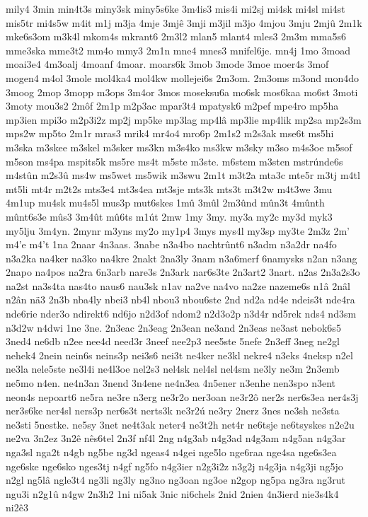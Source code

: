 {mily4
3min
min4t3s
miny3sk
miny5s6ke
3m4is3
mis4i
mi2sj
mi4sk
mi4sl
mi4st
mis5tr
mi4s5w
m4it
m1j
m3ja
4mje
3mjê
3mji
m3jil
m3jo
4mjou
3mju
2mjû
2m1k
mke6s3om
m3k4l
mkom4s
mkrant6
2m3l2
mlan5
mlant4
mles3
2m3m
mma5s6
mme3ska
mme3t2
mm4o
mmy3
2m1n
mne4
mnes3
mnifel6je.
mn4j
1mo
3moad
moai3e4
4m3oalj
4moanf
4moar.
moars6k
3mob
3mode
3moe
moer4s
3mof
mogen4
m4ol
3mole
mol4ka4
mol4kw
mollejei6s
2m3om.
2m3oms
m3ond
mon4do
3moog
2mop
3mopp
m3ops
3m4or
3mos
moseksu6a
mo6sk
mos6kaa
mo6st
3moti
3moty
mou3s2
2môf
2m1p
m2p3ac
mpar3t4
mpatysk6
m2pef
mpe4ro
mp5ha
mp3ien
mpi3o
m2p3i2z
mp2j
mp5ke
mp3lag
mp4lâ
mp3lie
mp4lik
mp2sa
mp2s3m
mps2w
mp5to
2m1r
mras3
mrik4
mr4o4
mro6p
2m1s2
m2s3ak
mse6t
ms5hi
m3ska
m3skee
m3skel
m3sker
ms3kn
m3s4ko
ms3kw
m3sky
m3so
m4s3oe
m5sof
m5son
ms4pa
mspits5k
ms5re
ms4t
m5ste
m3ste.
m6stem
m3sten
mstrúnde6s
m4stûn
m2s3û
ms4w
ms5wet
ms5wik
m3swu
2m1t
m3t2a
mta3c
mte5r
m3tj
m4tl
mt5li
mt4r
m2t2s
mts3e4
mt3s4ea
mt3sje
mts3k
mts3t
m3t2w
m4t3we
3mu
4m1up
mu4sk
mu4s5l
mus3p
mut6skes
1mû
3mûl
2m3ûnd
mûn3t
4mûnth
mûnt6s3e
mûs3
3m4ût
mû6ts
m1út
2mw
1my
3my.
my3a
my2c
my3d
myk3
my5lju
3m4yn.
2mynr
m3yns
my2o
my1p4
3mys
mys4l
my3sp
my3te
2m3z
2m'
m4'e
m4't
1na
2naar
4n3aas.
3nabe
n3a4bo
nachtrûnt6
n3adm
n3a2dr
na4fo
n3a2ka
na4ker
na3ko
na4kre
2nakt
2na3ly
3nam
n3a6merf
6namysks
n2an
n3ang
2napo
na4pos
na2ra
6n3arb
nare3s
2n3ark
nar6s3te
2n3art2
3nart.
n2as
2n3a2s3o
na2st
na3s4ta
nas4to
naus6
nau3sk
n1av
na2ve
na4vo
na2ze
nazeme6s
n1â
2nâl
n2ân
nä3
2n3b
nba4ly
nbei3
nb4l
nbou3
nbou6ste
2nd
nd2a
nd4e
ndeis3t
nde4ra
nde6rie
nder3o
ndirekt6
nd6jo
n2d3of
ndom2
n2d3o2p
n3d4r
nd5rek
nds4
nd3sm
n3d2w
n4dwi
1ne
3ne.
2n3eac
2n3eag
2n3ean
ne3and
2n3eas
ne3ast
nebok6s5
3ned4
ne6db
n2ee
nee4d
need3r
3neef
nee2p3
nee5ste
5nefe
2n3eff
3neg
ne2gl
nehek4
2nein
nein6s
neins3p
nei3s6
nei3t
ne4ker
ne3kl
nekre4
n3eks
4neksp
n2el
ne3la
nele5ste
ne3l4i
ne4l3oe
nel2s3
nel4sk
nel4sl
nel4sm
ne3ly
ne3m
2n3emb
ne5mo
n4en.
ne4n3an
3nend
3n4ene
ne4n3ea
4n5ener
n3enhe
nen3spo
n3ent
neon4s
nepoart6
ne5ra
ne3re
n3erg
ne3r2o
ner3oan
ne3r2ô
ner2s
ner6s3ea
ner4s3j
ner3s6ke
ner4sl
ners3p
ner6s3t
nerts3k
ne3r2ú
ne3ry
2nerz
3nes
ne3sh
ne3sta
ne3sti
5nestke.
ne5sy
3net
ne4t3ak
neter4
ne3t2h
net4r
ne6tsje
ne6tsyskes
n2e2u
ne2va
3n2ez
3n2ê
nês6tel
2n3f
nf4l
2ng
n4g3ab
n4g3ad
n4g3am
n4g5an
n4g3ar
nga3sl
nga2t
n4gb
ng5be
ng3d
ngeas4
n4gei
nge5lo
nge6raa
nge4sa
nge6s3ea
nge6ske
nge6sko
nges3tj
n4gf
ng5fo
n4g3ier
n2g3i2z
n3g2j
n4g3ja
n4g3ji
ng5jo
n2gl
ng5lâ
ngle3t4
ng3li
ng3ly
ng3no
ng3oan
ng3oe
n2gop
ng5pa
ng3ra
ng3rut
ngu3i
n2g1û
n4gw
2n3h2
1ni
ni5ak
3nic
ni6chels
2nid
2nien
4n3ierd
nie3s4k4
ni2ê3
}
